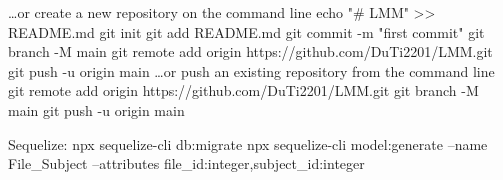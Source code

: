 …or create a new repository on the command line
echo "# LMM" >> README.md
git init
git add README.md
git commit -m "first commit"
git branch -M main
git remote add origin https://github.com/DuTi2201/LMM.git
git push -u origin main
…or push an existing repository from the command line
git remote add origin https://github.com/DuTi2201/LMM.git
git branch -M main
git push -u origin main



Sequelize: npx sequelize-cli db:migrate
npx sequelize-cli model:generate --name File_Subject --attributes file_id:integer,subject_id:integer